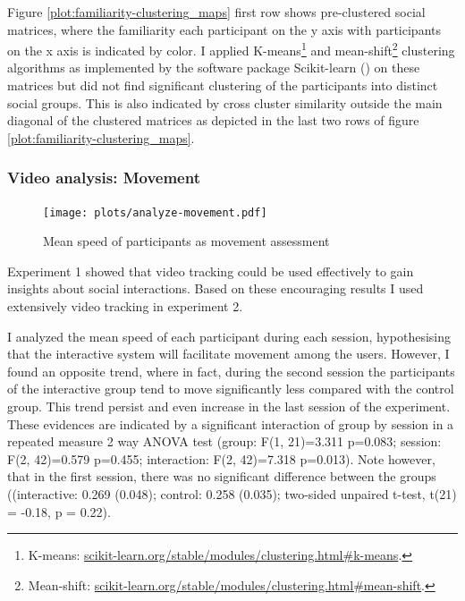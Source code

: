 \documentclass[a4paper,11pt]{article}
\begin{document}
{Figure \ref{plot:familiarity-clustering_maps} first row shows pre-clustered social matrices, where the familiarity each participant on the y axis with participants on the x axis is indicated by color.
I applied K-means\footnote{K-means: \href{http://scikit-learn.org/stable/modules/clustering.html\#k-means}{scikit-learn.org/stable/modules/clustering.html\#k-means}.} and mean-shift\footnote{Mean-shift: \href{http://scikit-learn.org/stable/modules/clustering.html\#mean-shift}{scikit-learn.org/stable/modules/clustering.html\#mean-shift}.} clustering algorithms as implemented by the software package Scikit-learn (\cite{scikit-learn}) on these matrices but did not find significant clustering of the participants into distinct social groups.
This is also indicated by cross cluster similarity outside the main diagonal of the clustered matrices as depicted in the last two rows of figure \ref{plot:familiarity-clustering_maps}.

\subsubsection{Video analysis: Movement}

\begin{figure}[!htb]
    \centering
    \texttt{[image: plots/analyze-movement.pdf]}
    \caption{Mean speed of participants as movement assessment}\label{plot:analyze-movement}
\end{figure}

Experiment 1 showed that video tracking could be used effectively to gain insights about social interactions.
Based on these encouraging results I used extensively video tracking in experiment 2.

I analyzed the mean speed of each participant during each session, hypothesising that the interactive system will facilitate movement among the users.
However, I found an opposite trend, where in fact, during the second session the participants of the interactive group tend to move significantly less compared with the control group.
This trend persist and even increase in the last session of the experiment.
These evidences are indicated by a significant interaction of group by session in a repeated measure 2 way ANOVA test (group: F(1, 21)=3.311 p=0.083; session: F(2, 42)=0.579 p=0.455; interaction: F(2, 42)=7.318 p=0.013).
Note however, that in the first session, there was no significant difference between the groups ((interactive: 0.269 (0.048); control: 0.258 (0.035); two-sided unpaired t-test, t(21) = -0.18, p = 0.22).

}
\end{document}
